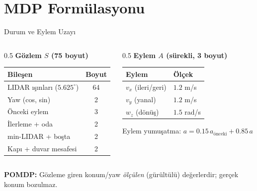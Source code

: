 \documentclass[aspectratio=169,11pt]{beamer}
\begin{document}
\section{MDP Formülasyonu}
\begin{frame}{Durum ve Eylem Uzayı}
  \begin{columns}[T]
    \begin{column}{0.5\textwidth}
      \textbf{Gözlem $S$ (75 boyut)}
      \footnotesize
      \begin{tabular}{lc}
        \toprule
        Bileşen & Boyut \\
        \midrule
        LIDAR ışınları ($5.625^\circ$) & 64 \\
        Yaw (cos, sin) & 2 \\
        Önceki eylem & 3 \\
        İlerleme + oda & 2 \\
        min-LIDAR + boşta & 2 \\
        Kapı + duvar mesafesi & 2 \\
        \bottomrule
      \end{tabular}
    \end{column}
    \begin{column}{0.5\textwidth}
      \textbf{Eylem $A$ (sürekli, 3 boyut)}
      \footnotesize
      \begin{tabular}{ll}
        \toprule
        Eylem & Ölçek \\
        \midrule
        $v_x$ (ileri/geri) & $1.2$ m/s \\
        $v_y$ (yanal) & $1.2$ m/s \\
        $w_z$ (dönüş) & $1.5$ rad/s \\
        \bottomrule
      \end{tabular}
      \vfill
      \scriptsize
      Eylem yumuşatma: $a = 0.15\,a_{\text{önceki}} + 0.85\,a$
    \end{column}
  \end{columns}
  \vfill
  \footnotesize
  \textbf{POMDP:} Gözleme giren konum/yaw \emph{ölçülen} (gürültülü) değerlerdir;
  gerçek konum bozulmaz.
\end{frame}
\end{document}
